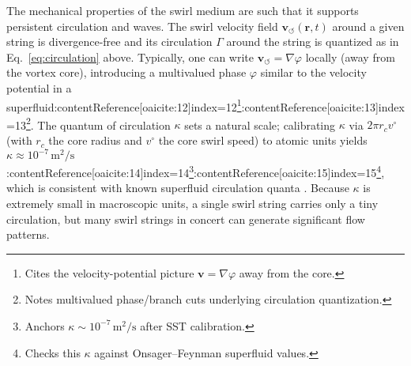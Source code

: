 \documentclass[12pt]{article}
\begin{document}
    The mechanical properties of the swirl medium are such that it supports persistent circulation and waves. The swirl velocity field $\mathbf{v}_{\!\boldsymbol{\circlearrowleft}}(\mathbf{r},t)$ around a given string is divergence-free and its circulation $\Gamma$ around the string is quantized as in Eq.~\eqref{eq:circulation} above. Typically, one can write $\mathbf{v}_{\!\boldsymbol{\circlearrowleft}} = \nabla \varphi$ locally (away from the vortex core), introducing a multivalued phase $\varphi$ similar to the velocity potential in a superfluid:contentReference[oaicite:12]{index=12}\footnote{Cites the velocity-potential picture $\mathbf v=\nabla\varphi$ away from the core.}:contentReference[oaicite:13]{index=13}\footnote{Notes multivalued phase/branch cuts underlying circulation quantization.}. The quantum of circulation $\kappa$ sets a natural scale; calibrating $\kappa$ via $2\pi r_c v^{\circ}$ (with $r_c$ the core radius and $v^{\circ}$ the core swirl speed) to atomic units yields $\kappa \approx 10^{-7}\,\mathrm{m}^2/\mathrm{s}$:contentReference[oaicite:14]{index=14}\footnote{Anchors $\kappa\sim10^{-7}\,\mathrm{m^2/s}$ after SST calibration.}:contentReference[oaicite:15]{index=15}\footnote{Checks this $\kappa$ against Onsager–Feynman superfluid values.}, which is consistent with known superfluid circulation quanta \cite{Onsager1949,Feynman1955}. Because $\kappa$ is extremely small in macroscopic units, a single swirl string carries only a tiny circulation, but many swirl strings in concert can generate significant flow patterns.
\end{document}
